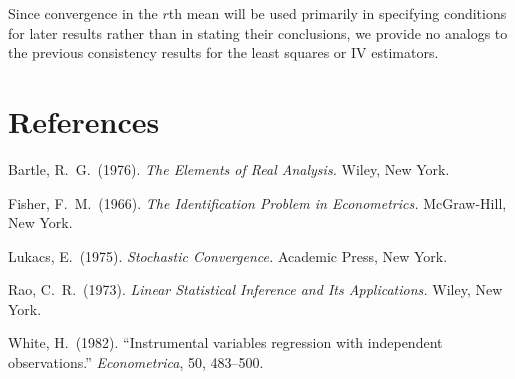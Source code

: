 Since convergence in the $r$th mean will be used primarily in specifying conditions for later results rather than in stating their conclusions, we
provide no analogs to the previous consistency results for the least squares
or IV estimators.

\section*{References}

\begin{list}{}{\setlength{\leftmargin}{1.5em}\setlength{\itemindent}{-1.5em}\setlength{\itemsep}{0.3em}\setlength{\parsep}{0pt}}
\item Bartle, R.\ G.\ (1976). \emph{The Elements of Real Analysis.} Wiley, New York.
\item Fisher, F.\ M.\ (1966). \emph{The Identification Problem in Econometrics.} McGraw-Hill, New York.
\item Lukacs, E.\ (1975). \emph{Stochastic Convergence.} Academic Press, New York.
\item Rao, C.\ R.\ (1973). \emph{Linear Statistical Inference and Its Applications.} Wiley, New York.
\item White, H.\ (1982). ``Instrumental variables regression with independent observations.'' \emph{Econometrica}, 50, 483--500.
\end{list}
